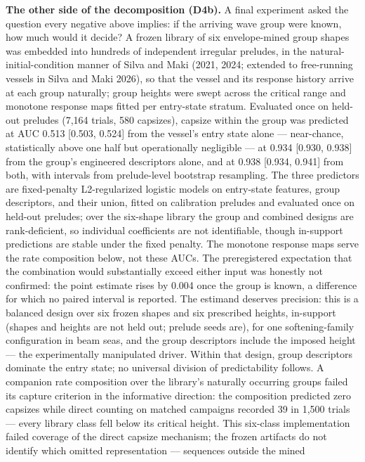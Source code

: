 \documentclass[11pt]{article}
\begin{document}
\textbf{The other side of the decomposition (D4b).} A final experiment asked the question every
negative above implies: if the arriving wave group were known, how much would it decide? A
frozen library of six envelope-mined group shapes was embedded into hundreds of independent
irregular preludes, in the natural-initial-condition manner of Silva and Maki (2021, 2024;
extended to free-running vessels in Silva and Maki 2026), so that
the vessel and its response history arrive at each group naturally; group heights were swept
across the critical range and monotone response maps fitted per entry-state stratum. Evaluated
once on held-out preludes (7,164 trials, 580 capsizes), capsize within the group was predicted
at AUC 0.513 [0.503, 0.524] from the vessel's entry state alone --- near-chance, statistically
above one half but operationally negligible --- at 0.934
[0.930, 0.938] from the group's engineered descriptors alone, and at 0.938 [0.934, 0.941] from
both, with intervals from prelude-level bootstrap resampling. The three predictors are
fixed-penalty L2-regularized logistic models on entry-state features, group descriptors, and
their union, fitted on calibration preludes and evaluated once on held-out preludes; over the
six-shape library the group and combined designs are rank-deficient, so individual
coefficients are not identifiable, though in-support predictions are stable under the fixed
penalty. The monotone response maps serve the rate composition below, not these AUCs. The
preregistered expectation
that the combination would substantially exceed either input was honestly not confirmed: the
point estimate rises by 0.004 once the group is known, a difference for which no paired
interval is reported. The estimand deserves precision: this is
a balanced design over six frozen shapes and six prescribed heights, in-support (shapes and
heights are not held out; prelude seeds are), for one softening-family configuration in beam
seas, and the group descriptors include the imposed height --- the experimentally manipulated
driver. Within that design, group descriptors dominate the entry state; no universal division
of predictability follows. A companion
rate composition over the library's naturally occurring groups failed its capture criterion in
the informative direction: the composition predicted zero capsizes while direct counting on
matched campaigns recorded 39 in 1,500 trials --- every library class fell below its critical
height. This six-class implementation failed coverage of the direct capsize mechanism; the
frozen artifacts do not identify which omitted representation --- sequences outside the mined
\end{document}
